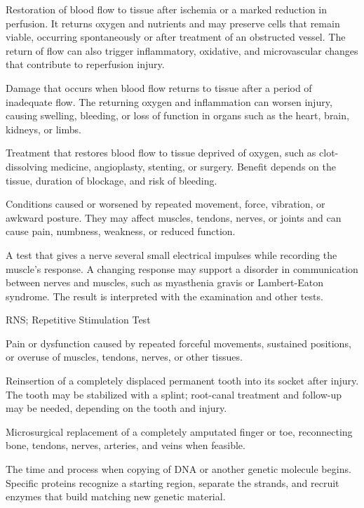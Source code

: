 Restoration of blood flow to tissue after ischemia or a marked reduction in perfusion.
It returns oxygen and nutrients and may preserve cells that remain viable, occurring spontaneously
or after treatment of an obstructed vessel. The return of flow can also trigger inflammatory,
oxidative, and microvascular changes that contribute to reperfusion injury.

 Damage that occurs when blood flow returns to tissue after a period of inadequate flow. The returning oxygen and inflammation can worsen injury, causing swelling, bleeding, or loss of function in organs such as the heart, brain, kidneys, or limbs.

 Treatment that restores blood flow to tissue deprived of oxygen, such as clot-dissolving medicine, angioplasty, stenting, or surgery. Benefit depends on the tissue, duration of blockage, and risk of bleeding.

 Conditions caused or worsened by repeated movement, force, vibration, or awkward posture. They may affect muscles, tendons, nerves, or joints and can cause pain, numbness, weakness, or reduced function.

 A test that gives a nerve several small electrical impulses while recording the muscle’s response. A changing response may support a disorder in communication between nerves and muscles, such as myasthenia gravis or Lambert-Eaton syndrome. The result is interpreted with the examination and other tests.

\synonyms
RNS; Repetitive Stimulation Test

 Pain or dysfunction caused by repeated forceful movements, sustained positions, or overuse of muscles, tendons, nerves, or other tissues.

 Reinsertion of a completely displaced permanent tooth into its socket after injury. The tooth may be stabilized with a splint; root-canal treatment and follow-up may be needed, depending on the tooth and injury.

 Microsurgical replacement of a completely amputated finger or toe, reconnecting bone, tendons, nerves, arteries, and veins when feasible.

 The time and process when copying of DNA or another genetic molecule begins. Specific proteins recognize a starting region, separate the strands, and recruit enzymes that build matching new genetic material.

